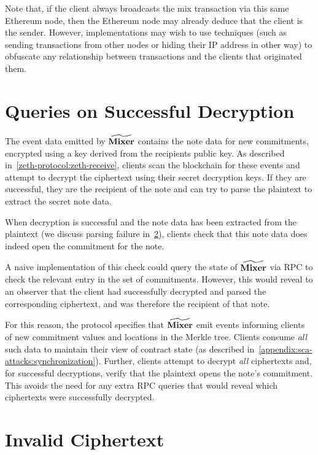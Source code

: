 Note that, if the client always broadcasts the mix transaction via this same Ethereum node, then the Ethereum node may already deduce that the client is the sender. However, implementations may wish to use techniques (such as sending transactions from other nodes or hiding their IP address in other way) to obfuscate any relationship between transactions and the clients that originated them.

\section{Queries on Successful Decryption}\label{appendix:sca-attacks:successful-decryption}

The event data emitted by $\widetilde{\mathbf{Mixer}}$ contains the note data for new commitments, encrypted using a key derived from the recipients public key. As described in~\cref{zeth-protocol:zeth-receive}, clients scan the blockchain for these events and attempt to decrypt the ciphertext using their secret decryption keys. If they are successful, they are the recipient of the note and can try to parse the plaintext to extract the secret note data.

When decryption is successful and the note data has been extracted from the plaintext (we discuss parsing failure in~\cref{appendix:sca-attacks:invalid-ciphertext}), clients \MUST{} check that this note data does indeed open the commitment for the note.

A naive implementation of this check could query the state of $\widetilde{\mathbf{Mixer}}$ via RPC to check the relevant entry in the set of commitments. However, this would reveal to an observer that the client had successfully decrypted and parsed the corresponding ciphertext, and was therefore the recipient of that note.

For this reason, the protocol specifies that $\widetilde{\mathbf{Mixer}}$ \MUST{} emit events informing clients of new commitment values and locations in the Merkle tree. Clients \MUST{} consume \emph{all} such data to maintain their view of contract state (as described in~\cref{appendix:sca-attacks:synchronization}). Further, clients \MUST{} attempt to decrypt \emph{all} ciphertexts and, for successful decryptions, \MUST{} verify that the plaintext opens the note's commitment. This avoids the need for any extra RPC queries that would reveal which ciphertexts were successfully decrypted.

\section{Invalid Ciphertext}\label{appendix:sca-attacks:invalid-ciphertext}

